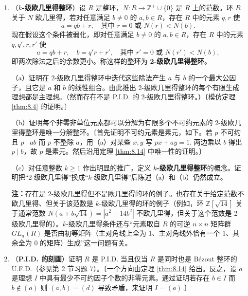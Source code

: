 \begin{enumerate}
\item （\textbf{\(k\)-级欧几里得整环}）设 \(R\) 是整环，\(N : R \to \mathbb{Z}^+ \cup \{0\}\) 是 \(R\) 上的范数。环 \(R\) 关于 \(N\) 欧几里得，若对任意满足 \(b \neq 0\) 的 \(a, b \in R\)，存在 \(R\) 中的元素 \(q, r\) 使
\[
a = qb + r, \quad \text{其中 } r = 0 \text{ 或 } N(r) < N(b).
\]
现在假设这个条件被弱化，即对任意满足 \(b \neq 0\) 的 \(a, b \in R\)，存在 \(R\) 中的元素 \(q, q', r, r'\) 使
\[
a = qb + r, \quad b = q'r + r', \quad \text{其中 } r' = 0 \text{ 或 } N(r') < N(b),
\]
即两次除法之后的余数更小。称这样的整环为 \textbf{2-级欧几里得整环}。

（a）证明在 2-级欧几里得整环中迭代这些除法产生 \(a\) 与 \(b\) 的一个最大公因子，且它是 \(a\) 和 \(b\) 的线性组合。由此推出 2-级欧几里得整环的每个有限生成理想都是主理想。（然而存在不是 P.I.D. 的 2-级欧几里得整环。）〔模仿定理 \ref{thm:8.4} 的证明。〕

（b）证明每个非零非单位元素都可以分解为有限多个不可约元素的 2-级欧几里得整环是唯一分解整环。〔首先证明不可约元素是素元，如下。若 \(p\) 不可约且 \(p \mid ab\) 而 \(p\) 不整除 \(a\)，用（a）对某些 \(x, y\) 写 \(px + ay = 1\). 两边乘以 \(b\) 得出 \(p \mid b\)，故 \(p\) 是素元。然后沿用定理 \ref{thm:8.14} 中唯一性的证明。〕

（c）对任意整数 \(k \geq 1\) 作出明显的推广，定义 \textbf{\(k\)-级欧几里得整环}的概念。证明把“2-级欧几里得”换成“\(k\)-级欧几里得”后陈述（a）和（b）仍然成立。

\noindent\textbf{注：}存在是 2-级欧几里得但不是欧几里得的环的例子。也存在关于给定范数不欧几里得、但关于该范数是 \(k\)-级欧几里得的环的例子（例如，环 \(\mathbb{Z}[\sqrt{14}]\) 关于通常范数 \(N(a+b\sqrt{14}) = |a^2-14b^2|\) 不欧几里得，但关于这个范数是 2-级欧几里得的）。\(k\)-级欧几里得条件还与“元素取自 \(R\) 的可逆 \(n \times n\) 矩阵群 \(GL_n(R)\) 是否由初等矩阵（主对角线上全为 1、主对角线外恰有一个 1、其余全为 0 的矩阵）生成”这一问题有关。

\item （\textbf{P.I.D. 的刻画}）证明 \(R\) 是 P.I.D. 当且仅当 \(R\) 是同时也是 Bézout 整环的 U.F.D.（参见第 2 节习题 7）。〔一个方向由定理 \ref{thm:8.14} 给出。反之，设 \(a\) 是理想 \(I\) 中具有最少不可约因子个数的非零元素。通过证明若存在 \(b \in I\) 而 \(b \notin (a)\) 则 \((a, b) = (d)\) 导致矛盾，来证明 \(I = (a)\).〕
\end{enumerate}
